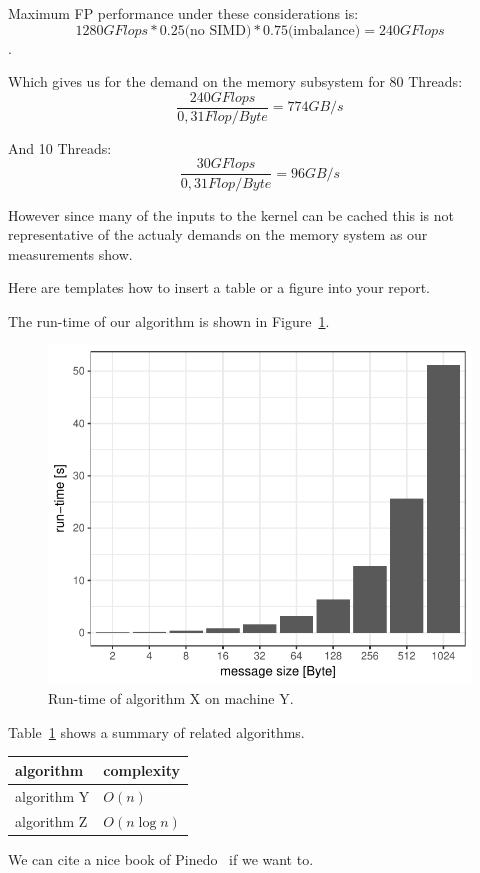 Maximum FP performance under these considerations is:
$$1280 GFlops * 0.25 \text{(no SIMD)}  * 0.75 \text{(imbalance)} = 240 GFlops$$.

Which gives us for the demand on the memory subsystem for 80 Threads:
$$\frac{240 GFlops}{0,31 Flop/Byte} = 774 GB/s$$

And 10 Threads:
$$\frac{30 GFlops}{0,31 Flop/Byte} = 96 GB/s$$

However since many of the inputs to the kernel can be cached this is not representative of the actualy demands on the memory system as our measurements show.

















\newpage

Here are templates how to insert a table or a figure into your report.

The run-time of our algorithm is shown in Figure~\ref{fig:runtime}.

\begin{figure}[ht]
\centering
\includegraphics[width=.5\linewidth]{figures/runtime}
\caption{Run-time of algorithm X on machine Y.}
\label{fig:runtime}
\end{figure}


Table~\ref{tab:related_algorithms} shows a summary of related algorithms.

\begin{table}[ht]
\centering
{}
\label{tab:related_algorithms}
\begin{tabular}{ll}
\toprule
algorithm & complexity \\
\midrule
algorithm Y & $O(n)$ \\
algorithm Z & $O(n \log{n} )$ \\
\bottomrule
\end{tabular}
\end{table}

We can cite a nice book of Pinedo~\cite{Pinedo:2008vs} if we want to.
